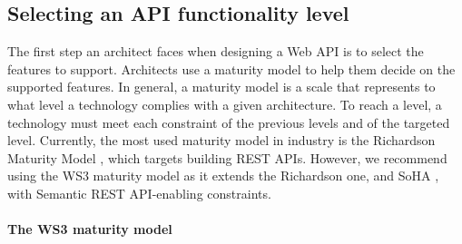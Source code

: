 



\subsection{Selecting an API functionality level}\label{sec:maturityLevel}

The first step an architect faces when designing a Web API is to select the features to support.
Architects use a maturity model to help them decide on the supported features. In general, a maturity model is a scale that represents to what level a technology complies with a given architecture. To reach a level, a technology must meet each constraint of the previous levels and of the targeted level.
Currently, the most used maturity model in industry is the Richardson Maturity Model \cite{RichardsonMaturityModel}, which targets building REST APIs. However, we recommend using the WS3 maturity model \cite{7195633} as it extends the Richardson one, and SoHA \cite{SoHA}, with Semantic REST API-enabling constraints.

\paragraph{The WS3 maturity model}

